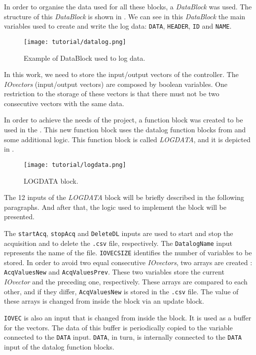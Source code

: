 In order to organise the data used for all these blocks, a \emph{DataBlock} was
used. The structure of this \emph{DataBlock} is shown in . We can see in this \emph{DataBlock} the main variables used to create
and write the log data: \verb|DATA|, \verb|HEADER|, \verb|ID| and \verb|NAME|.


\begin{figure}[H] \centering
 \texttt{[image: tutorial/datalog.png]}
  \caption{Example of DataBlock used to log data.}
  \label{fig:exampleDataBlock}
\end{figure}


In this work, we need to store the input\slash output
vectors of the controller. The \emph{IOvectors} (input\slash output vectors) are composed by
boolean variables. One restriction to the storage of these vectors is that there
must not be two consecutive vectors with the same data.

In order to achieve the needs of the project, a
function block was created to be used in the \LD. This new function block uses the datalog function blocks from  and some additional logic. This function block is called \emph{LOGDATA}, and it is
depicted in
.
\begin{figure}[H] \centering
 \texttt{[image: tutorial/logdata.png]}
  \caption{LOGDATA block.}
  \label{fig:logdataBlock}
\end{figure}
The 12 inputs of the \emph{LOGDATA} block will be briefly described in the following paragraphs. And after that, the logic used to implement the block will be presented.

The \verb|startAcq|,
\verb|stopAcq| and \verb|DeleteDL| inputs are used to start and stop the
acquisition and to
delete the \verb|.csv| file, respectively. The \verb|DatalogName| input represents the name of the file. \verb|IOVECSIZE| identifies the number of variables to
be stored.
In order to avoid two equal consecutive \emph{IOvectors}, two arrays are
created : \verb|AcqValuesNew| and
\verb|AcqValuesPrev|. These two variables store the current \emph{IOvector} and the preceding one, respectively. These arrays are compared to each other, and if
they differ, \verb|AcqValuesNew| is stored in the \verb|.csv| file. 
 The value of these arrays is
changed from inside the block via an update block.

\verb|IOVEC| is also an input that is changed from inside the block. It
is used as a buffer for the vectors. The data of this buffer is periodically copied to the variable connected to the
\verb|DATA| input. \verb|DATA|, in turn, is internally connected to the \verb|DATA| input of the datalog function blocks. 

